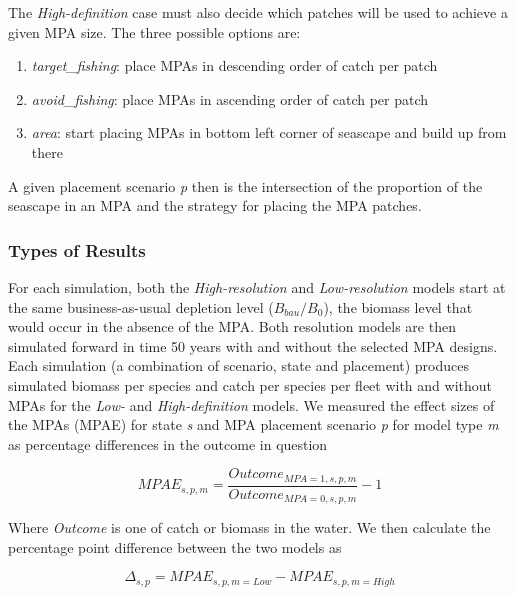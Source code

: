 \documentclass[
  default,
  lineno,
  referee]{sn-jnl}
\providecommand{\tightlist}{%
  \setlength{\itemsep}{0pt}\setlength{\parskip}{0pt}}\usepackage{longtable,booktabs,array}
\begin{document}
The \emph{High-definition} case must also decide which patches will be
used to achieve a given MPA size. The three possible options are:

\begin{enumerate}
\def\labelenumi{\arabic{enumi}.}
\tightlist
\item
  \emph{target\_fishing}: place MPAs in descending order of catch per
  patch
\item
  \emph{avoid\_fishing}: place MPAs in ascending order of catch per
  patch
\item
  \emph{area}: start placing MPAs in bottom left corner of seascape and
  build up from there
\end{enumerate}

A given placement scenario \emph{p} then is the intersection of the
proportion of the seascape in an MPA and the strategy for placing the
MPA patches.

\subsubsection{Types of Results}\label{types-of-results}

For each simulation, both the \emph{High-resolution} and
\emph{Low-resolution} models start at the same business-as-usual
depletion level (\(B_{bau} /  B_{0}\)), the biomass level that would
occur in the absence of the MPA. Both resolution models are then
simulated forward in time 50 years with and without the selected MPA
designs. Each simulation (a combination of scenario, state and
placement) produces simulated biomass per species and catch per species
per fleet with and without MPAs for the \emph{Low-} and
\emph{High-definition} models. We measured the effect sizes of the MPAs
(MPAE) for state \emph{s} and MPA placement scenario \emph{p} for model
type \emph{m} as percentage differences in the outcome in question

\[
MPAE_{s,p,m} = \frac{Outcome_{MPA=1,s,p,m}}{Outcome_{MPA=0,s,p,m}} -1 
\]

Where \emph{Outcome} is one of catch or biomass in the water. We then
calculate the percentage point difference between the two models as

\[
\Delta_{s,p} = MPAE_{s,p,m=Low} - MPAE_{s,p,m=High}
\]
\end{document}
